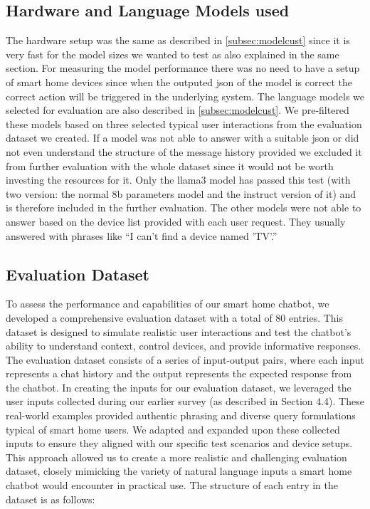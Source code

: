 \subsection{Hardware and Language Models used}
\label{subsec:hardware-llm}
The hardware setup was the same as described in \cref{subsec:modelcust} since it is very fast for the model sizes we wanted to test as also explained in the same section.
For measuring the model performance there was no need to have a setup of smart home devices since when the outputed \gls{json} of the model is correct the correct action will be triggered in the underlying system.
The language models we selected for evaluation are also described in \cref{subsec:modelcust}.
We pre-filtered these models based on three selected typical user interactions from the evaluation dataset we created. If a model was not able to answer with a suitable \gls{json} or did not even understand the structure of the message history provided we excluded it from further evaluation with the whole dataset since it would not be worth investing the resources for it.
Only the llama3 model has passed this test (with two version: the normal 8b parameters model and the instruct version of it) and is therefore included in the further evaluation. The other models were not able to answer based on the device list provided with each user request. They usually answered with phrases like ``I can't find a device named 'TV'.''

\subsection{Evaluation Dataset}
To assess the performance and capabilities of our smart home chatbot, we developed a comprehensive evaluation dataset with a total of 80 entries. This dataset is designed to simulate realistic user interactions and test the chatbot's ability to understand context, control devices, and provide informative responses.
The evaluation dataset consists of a series of input-output pairs, where each input represents a chat history and the output represents the expected response from the chatbot. 
In creating the inputs for our evaluation dataset, we leveraged the user inputs collected during our earlier survey (as described in Section 4.4). These real-world examples provided authentic phrasing and diverse query formulations typical of smart home users. We adapted and expanded upon these collected inputs to ensure they aligned with our specific test scenarios and device setups. This approach allowed us to create a more realistic and challenging evaluation dataset, closely mimicking the variety of natural language inputs a smart home chatbot would encounter in practical use.
The structure of each entry in the dataset is as follows:

